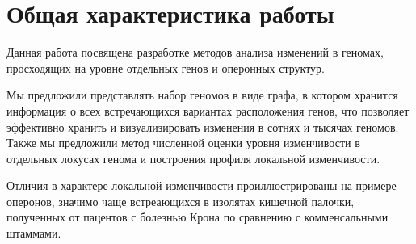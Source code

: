 \section*{Общая характеристика работы}
Данная работа посвящена разработке методов анализа изменений в геномах, просходящих на уровне отдельных генов и оперонных структур.

Мы предложили представлять набор геномов в виде графа, в котором хранится информация о всех встречающихся вариантах расположения генов, что позволяет эффективно хранить и визуализировать изменения в сотнях и тысячах геномов. Также мы предложили метод численной оценки уровня изменчивости в отдельных локусах генома и построения профиля локальной изменчивости. 

Отличия в характере локальной изменчивости проиллюстрированы на примере оперонов, значимо чаще встреающихся в изолятах кишечной палочки, полученных от пацентов с болезнью Крона по сравнению с комменсальными штаммами.
\newcommand{\actuality}{\pdfbookmark[1]{Актуальность}{actuality}\underline{\textbf{\actualityTXT}}}
\newcommand{\progress}{\pdfbookmark[1]{Разработанность темы}{progress}\underline{\textbf{\progressTXT}}}
\newcommand{\aim}{\pdfbookmark[1]{Цели}{aim}\underline{{\textbf\aimTXT}}}
\newcommand{\tasks}{\pdfbookmark[1]{Задачи}{tasks}\underline{\textbf{\tasksTXT}}}
\newcommand{\aimtasks}{\pdfbookmark[1]{Цели и задачи}{aimtasks}\aimtasksTXT}
\newcommand{\novelty}{\pdfbookmark[1]{Научная новизна}{novelty}\underline{\textbf{\noveltyTXT}}}
\newcommand{\influence}{\pdfbookmark[1]{Практическая значимость}{influence}\underline{\textbf{\influenceTXT}}}
\newcommand{\defpositions}{\pdfbookmark[1]{Положения, выносимые на защиту}{defpositions}\underline{\textbf{\defpositionsTXT}}}
\newcommand{\reliability}{\pdfbookmark[1]{Достоверность}{reliability}\underline{\textbf{\reliabilityTXT}}}
\newcommand{\probation}{\pdfbookmark[1]{Апробация}{probation}\underline{\textbf{\probationTXT}}}
\newcommand{\contribution}{\pdfbookmark[1]{Личный вклад}{contribution}\underline{\textbf{\contributionTXT}}}
\newcommand{\publications}{\pdfbookmark[1]{Публикации}{publications}\underline{\textbf{\publicationsTXT}}}


